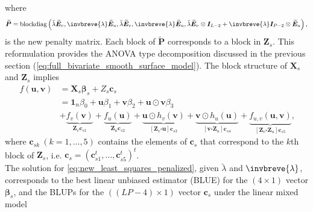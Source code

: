 where
\begin{equation}
    \widetilde{\boldsymbol{P}} = \text{blockdiag}\left(\breve{\lambda} \widetilde{\boldsymbol{E}}_{v}, \invbreve{\lambda} \widetilde{\boldsymbol{E}}_{u}, \breve{\lambda} \widetilde{\boldsymbol{E}}_{v}, \invbreve{\lambda} \widetilde{\boldsymbol{E}}_{u}, \breve{\lambda} \widetilde{\boldsymbol{E}}_{v} \otimes \boldsymbol{I}_{L-2}+\invbreve{\lambda} \boldsymbol{I}_{P-2} \otimes \widetilde{\boldsymbol{E}}_{u}\right)
    \text{,}
\end{equation}
is the new penalty matrix. Each block of $\widetilde{\boldsymbol{P}}$ corresponds to a block in $\mathbf{Z}_s$. This reformulation provides the ANOVA type decomposition discussed in the previous section (\ref{eq:full_bivariate_smooth_surface_model}). The block structure of $\mathbf{X}_s$ and $\mathbf{Z}_s$ implies
\begin{equation}
    \begin{aligned} 
        f(\boldsymbol{u}, \boldsymbol{v}) &
        =\boldsymbol{X}_{s} \boldsymbol{\beta}_{s}+Z_{s} \boldsymbol{c}_{s} \\ 
        &=\mathbf{1}_{n} \beta_{0}+\boldsymbol{u} \beta_{1}+\boldsymbol{v} \beta_{2}+\boldsymbol{u} \odot \boldsymbol{v} \beta_{3} \\
        & + \underbrace{f_{v}(\boldsymbol{v})}_{\boldsymbol{Z}_{v} \boldsymbol{c}_{s 1}}+\underbrace{f_{u}(\boldsymbol{u})}_{\boldsymbol{Z}_{u} \boldsymbol{c}_{s 2}} +\underbrace{\boldsymbol{u} \odot h_{v}(\boldsymbol{v})}_{\left[\boldsymbol{Z}_{v} \square \boldsymbol{u}\right] \boldsymbol{c}_{s 3}}+\underbrace{\boldsymbol{v} \odot h_{u}(\boldsymbol{u})}_{\left[\boldsymbol{v} \square \boldsymbol{Z}_{u}\right] \boldsymbol{c}_{s 4}} +\underbrace{f_{u, v}(\boldsymbol{u}, \boldsymbol{v})}_{\left[\boldsymbol{Z}_{v} \square \boldsymbol{Z}_{u}\right] \boldsymbol{c}_{s 5}}
        \text{,}
    \end{aligned}
\end{equation}
where $\boldsymbol{c}_{sk} \ (k = 1,\ldots,5)$ contains the elements of $\boldsymbol{c}_s$ that correspond to the $k$th block of $\boldsymbol{Z}_s$, i.e. $\boldsymbol{c}_s = (\boldsymbol{c}_{s1}^t,\ldots,\boldsymbol{c}_{s5}^t)^t$.\\
The solution for \ref{eq:new_least_squares_penalized}, given $\breve{\lambda}$ and $\invbreve{\lambda}$, corresponds to the best linear unbiased estimator (BLUE) for the $(4\times1)$ vector $\boldsymbol{\beta}_s$, and the BLUPs for the $((LP - 4) \times 1)$ vector $\boldsymbol{c}_s$ under the linear mixed model

